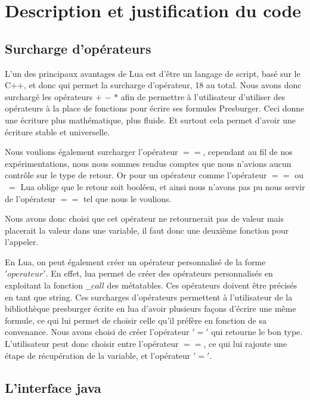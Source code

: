 \section{Description et justification du code}

\subsection{Surcharge d'opérateurs}

L'un des principaux avantages de Lua est d'être un langage de script, basé sur le C++, et donc qui permet la surcharge d'opérateur, 18 au total. Nous avons donc surchargé les opérateurs $+$ $-$ $*$ afin de permettre à l'utilisateur d'utiliser des opérateurs à la place de fonctions pour écrire ses formules Presburger. Ceci donne une écriture plus mathématique, plus fluide. Et surtout cela permet d'avoir une écriture stable et universelle.\\\par

Nous voulions également surcharger l'opérateur $==$, cependant au fil de nos expérimentations, nous nous sommes rendus comptes que nous n'avions aucun contrôle sur le type de retour. Or pour un opérateur comme l'opérateur $==$ ou $~=$ Lua oblige que le retour soit booléen, et ainsi nous n'avons pas pu nous servir de l'opérateur $==$ tel que nous le voulions.\\\par
 
Nous avons donc choisi que cet opérateur ne retournerait pas de valeur mais placerait la valeur dans une variable, il faut donc une deuxième fonction pour l'appeler.\\\par

En Lua, on peut également créer un opérateur personnalisé de la forme $'operateur'$. En effet, lua permet de créer des opérateurs personnalisés en exploitant la fonction $\_\_call$ des métatables. Ces opérateurs doivent être précisés en tant que string. Ces surcharges d’opérateurs permettent à l’utilisateur de la bibliothèque presburger écrite en lua d’avoir plusieurs façons d’écrire une même formule, ce qui lui permet de choisir celle qu’il préfère en fonction de sa convenance. Nous avons choisi de créer l'opérateur $'='$ qui retourne le bon type. L'utilisateur peut donc choisir entre l'opérateur $==$, ce qui lui rajoute une étape de récupération de la variable, et l'opérateur $'='$.

\subsection{L’interface java}

